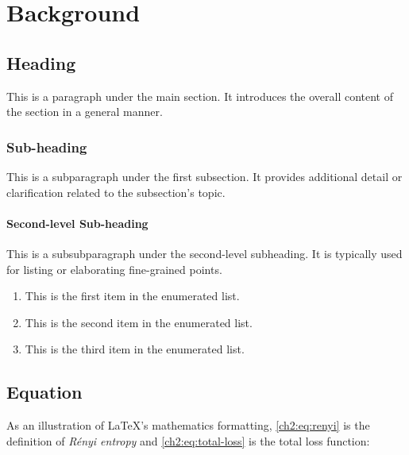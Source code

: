 \chapter{Background}		
\label{chapter2}

\section{Heading}

\begin{paragraph}
This is a paragraph under the main section. It introduces the overall content of the section in a general manner.
\end{paragraph}

\subsection{Sub-heading}

\begin{subparagraph}
This is a subparagraph under the first subsection. It provides additional detail or clarification related to the subsection's topic.
\end{subparagraph}

\subsubsection{Second-level Sub-heading}

\begin{subsubparagraph}
This is a subsubparagraph under the second-level subheading. It is typically used for listing or elaborating fine-grained points.
\end{subsubparagraph}

\begin{enumerate}[itemindent=\subsubparitemindent]
\item This is the first item in the enumerated list.
\item This is the second item in the enumerated list.
\item This is the third item in the enumerated list.
\end{enumerate}



\section{Equation} 

\begin{paragraph}
As an illustration of \LaTeX's mathematics formatting,
\autoref{ch2:eq:renyi} is the definition of {\em R\'enyi entropy} and \autoref{ch2:eq:total-loss} is the total loss function:
\end{paragraph}

